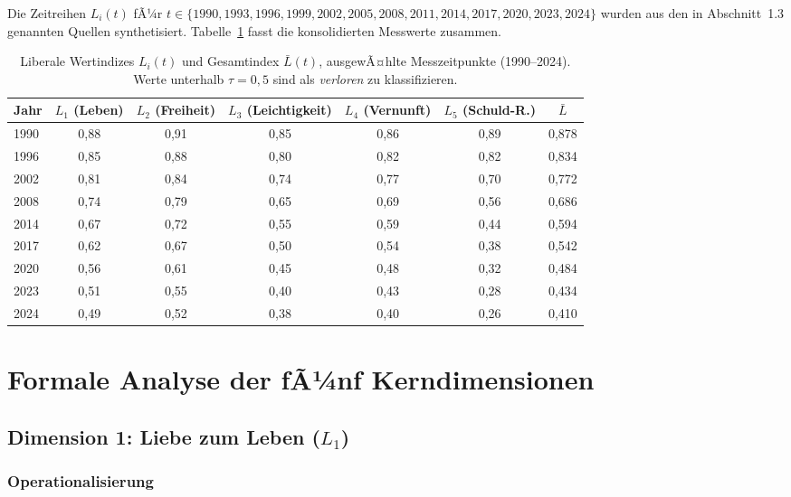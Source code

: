 ﻿\documentclass[a4paper,12pt]{article}
\theoremstyle{definition}
\begin{document}
Die Zeitreihen $L_i(t)$ fÃ¼r $t \in \{1990, 1993, 1996, 1999, 2002, 2005, 2008, 2011, 2014, 2017, 2020, 2023, 2024\}$ wurden aus den in Abschnitt~1.3 genannten Quellen synthetisiert. Tabelle~\ref{tab:daten} fasst die konsolidierten Messwerte zusammen.

\begin{table}[h!]
\centering
\renewcommand{\arraystretch}{1.25}
\begin{tabular}{lcccccc}
\toprule
\textbf{Jahr} & $L_1$ (Leben) & $L_2$ (Freiheit) & $L_3$ (Leichtigkeit) & $L_4$ (Vernunft) & $L_5$ (Schuld-R.) & $\bar{L}$ \\
\midrule
1990 & 0{,}88 & 0{,}91 & 0{,}85 & 0{,}86 & 0{,}89 & 0{,}878 \\
1996 & 0{,}85 & 0{,}88 & 0{,}80 & 0{,}82 & 0{,}82 & 0{,}834 \\
2002 & 0{,}81 & 0{,}84 & 0{,}74 & 0{,}77 & 0{,}70 & 0{,}772 \\
2008 & 0{,}74 & 0{,}79 & 0{,}65 & 0{,}69 & 0{,}56 & 0{,}686 \\
2014 & 0{,}67 & 0{,}72 & 0{,}55 & 0{,}59 & 0{,}44 & 0{,}594 \\
2017 & 0{,}62 & 0{,}67 & 0{,}50 & 0{,}54 & 0{,}38 & 0{,}542 \\
2020 & 0{,}56 & 0{,}61 & 0{,}45 & 0{,}48 & 0{,}32 & 0{,}484 \\
2023 & 0{,}51 & 0{,}55 & 0{,}40 & 0{,}43 & 0{,}28 & 0{,}434 \\
2024 & 0{,}49 & 0{,}52 & 0{,}38 & 0{,}40 & 0{,}26 & 0{,}410 \\
\bottomrule
\end{tabular}
\caption{Liberale Wertindizes $L_i(t)$ und Gesamtindex $\bar{L}(t)$, ausgewÃ¤hlte Messzeitpunkte (1990--2024). Werte unterhalb $\tau = 0{,}5$ sind als \emph{verloren} zu klassifizieren.}
\label{tab:daten}
\end{table}

\section{Formale Analyse der fÃ¼nf Kerndimensionen}

\subsection{Dimension 1: Liebe zum Leben ($L_1$)}

\subsubsection{Operationalisierung}
\end{document}
